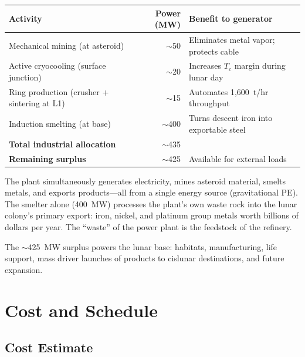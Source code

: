 \documentclass[12pt,letterpaper]{article}
\begin{document}
\begin{center}
\small
\begin{tabular}{lrl}
\toprule
\textbf{Activity} & \textbf{Power (MW)} & \textbf{Benefit to generator} \\
\midrule
Mechanical mining (at asteroid) & $\sim$50 & Eliminates metal vapor; protects cable \\
Active cryocooling (surface junction) & $\sim$20 & Increases $T_c$ margin during lunar day \\
Ring production (crusher + sintering at L1) & $\sim$15 & Automates 1,600~t/hr throughput \\
Induction smelting (at base) & $\sim$400 & Turns descent iron into exportable steel \\
\midrule
\textbf{Total industrial allocation} & $\sim$435 & \\
\textbf{Remaining surplus} & $\sim$425 & Available for external loads \\
\bottomrule
\end{tabular}
\end{center}

The plant simultaneously generates electricity, mines asteroid material, smelts metals, and exports products---all from a single energy source (gravitational PE). The smelter alone (400~MW) processes the plant's own waste rock into the lunar colony's primary export: iron, nickel, and platinum group metals worth billions of dollars per year. The ``waste'' of the power plant is the feedstock of the refinery.

The ${\sim}$425~MW surplus powers the lunar base: habitats, manufacturing, life support, mass driver launches of products to cislunar destinations, and future expansion.

\section{Cost and Schedule}

\subsection{Cost Estimate}
\end{document}
